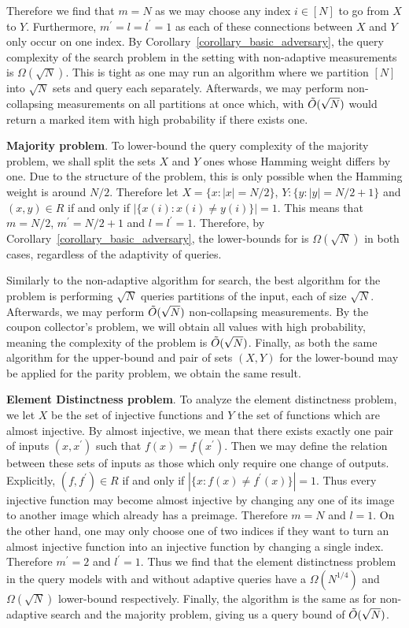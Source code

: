 Therefore we find that $m=N$ as we may choose any index $i\in[N]$ to go from $X$ to $Y$. Furthermore, $m^\prime = l = l^\prime = 1$ as each of these connections between $X$ and $Y$ only occur on one index. By Corollary~\ref{corollary_basic_adversary}, the query complexity of the search problem in the \pdqpname setting with non-adaptive measurements is $\Omega(\sqrt{N})$. This is tight as one may run an algorithm where we partition $[N]$ into $\sqrt{N}$ sets and query each separately. Afterwards, we may perform non-collapsing measurements on all partitions at once which, with $\Tilde{O}(\sqrt{N})$ would return a marked item with high probability if there exists one.

\textbf{Majority problem}. To lower-bound the query complexity of the majority problem, we shall split the sets $X$ and $Y$ ones whose Hamming weight differs by one. Due to the structure of the problem, this is only possible when the Hamming weight is around $N/2$. Therefore let $X=\{x:|x|=N/2\}$, $Y: \{y: |y|=N/2+1\}$ and $(x,y)\in R$ if and only if $|\{x(i): x(i)\neq y(i)\}| = 1$. This means that $m=N/2$, $m^\prime=N/2+1$ and $l=l^\prime = 1$. Therefore, by Corollary~\ref{corollary_basic_adversary}, the lower-bounds for \pdqpname is $\Omega(\sqrt{N})$ in both \pdqpname cases, regardless of the adaptivity of queries. 

Similarly to the non-adaptive algorithm for search, the best algorithm for the problem is performing $\sqrt{N}$ queries partitions of the input, each of size $\sqrt{N}$. Afterwards, we may perform $\Tilde{O}(\sqrt{N})$ non-collapsing measurements. By the coupon collector's problem, we will obtain all values with high probability, meaning the complexity of the problem is $\Tilde{O}(\sqrt{N})$. Finally, as both the same algorithm for the upper-bound and pair of sets $(X,Y)$ for the lower-bound may be applied for the parity problem, we obtain the same result.

\textbf{Element Distinctness problem}. To analyze the element distinctness problem, we let $X$ be the set of injective functions and $Y$ the set of functions which are almost injective. By almost injective, we mean that there exists exactly one pair of inputs $(x,x^\prime)$ such that $f(x)=f(x^\prime)$. Then we may define the relation between these sets of inputs as those which only require one change of outputs. Explicitly, $(f,f^\prime)\in R$ if and only if $|\{x: f(x)\neq f^\prime(x)\}| = 1$. Thus every injective function may become almost injective by changing any one of its image to another image which already has a preimage. Therefore $m=N$ and $l=1$. On the other hand, one may only choose one of two indices if they want to turn an almost injective function into an injective function by changing a single index. Therefore $m^\prime = 2$ and $l^\prime = 1$. Thus we find that the element distinctness problem in the \pdqpname query models with and without adaptive queries have a $\Omega(N^{1/4})$ and $\Omega(\sqrt{N})$ lower-bound respectively. Finally, the algorithm is the same as for non-adaptive search and the majority problem, giving us a query bound of $\Tilde{O}(\sqrt{N})$.

